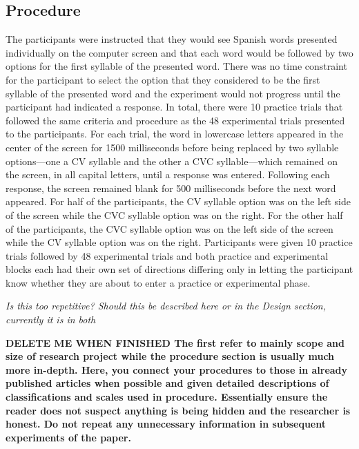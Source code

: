 \subsection{Procedure}

The participants were instructed that they would see Spanish words presented individually on the computer screen and that each word would be followed by two options for the first syllable of the presented word. There was no time constraint for the participant to select the option that they considered to be the first syllable of the presented word and the experiment would not progress until the participant had indicated a response. In total, there were 10 practice trials that followed the same criteria and procedure as the 48 experimental trials presented to the participants. For each trial, the word in lowercase letters appeared in the center of the screen for 1500 milliseconds before being replaced by two syllable options---one a CV syllable and the other a CVC syllable---which remained on the screen, in all capital letters, until a response was entered. Following each response, the screen remained blank for 500 milliseconds before the next word appeared. For half of the participants, the CV syllable option was on the left side of the screen while the CVC syllable option was on the right. For the other half of the participants, the CVC syllable option was on the left side of the screen while the CV syllable option was on the right. Participants were given 10 practice trials followed by 48 experimental trials and both practice and experimental blocks each had their own set of directions differing only in letting the participant know whether they are about to enter a practice or experimental phase.

\emph{Is this too repetitive? Should this be described here or in the Design section, currently it is in both}

\textbf{DELETE ME WHEN FINISHED
The first refer to mainly scope and size of research project while the procedure section is usually much more in-depth. Here, you connect your procedures to those in already published articles when possible and given detailed descriptions of classifications and scales used in procedure. Essentially ensure the reader does not suspect anything is being hidden and the researcher is honest. Do not repeat any unnecessary information in subsequent experiments of the paper.}


